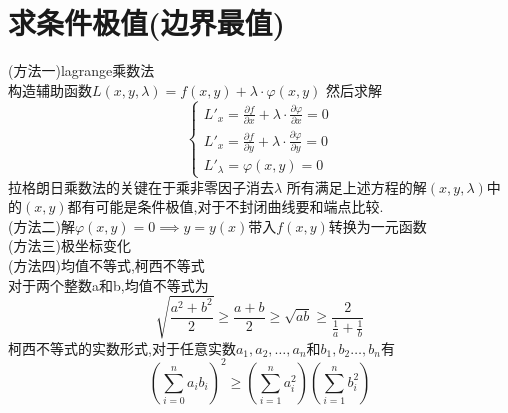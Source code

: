 \documentclass[12pt, a4paper, oneside, UTF8]{ctexbook}
\begin{document}
\section{求条件极值(边界最值)}
\begin{remark}
    (方法一)lagrange乘数法 \\
    构造辅助函数$L(x,y,\lambda)=f(x,y)+\lambda\cdot\varphi(x,y)$ 然后求解 
    $$
    \begin{cases}
        L'_{x}= \frac{\partial f}{\partial x} + \lambda\cdot\frac{\partial\varphi}{\partial x} = 0 \\
        L'_{x}= \frac{\partial f}{\partial y} + \lambda\cdot\frac{\partial\varphi}{\partial y} = 0 \\
        L'_{\lambda} = \varphi(x,y) = 0
    \end{cases}
    $$
    拉格朗日乘数法的关键在于{\color{red}乘非零因子消去$\lambda$}
    所有满足上述方程的解$(x,y,\lambda)$中的$(x,y)$都有可能是条件极值,{\color{red}对于不封闭曲线要和端点比较}. \\
    (方法二)解$\varphi(x,y)=0\implies y = y(x)$带入$f(x,y)$转换为一元函数 \\
    (方法三)极坐标变化 \\
    (方法四)均值不等式,柯西不等式 \\
    对于两个整数a和b,均值不等式为 
    $$
    \sqrt{\frac{a^2+b^2}{2}}\geq\frac{a+b}{2}\geq\sqrt{ab}\geq\frac{2}{\frac{1}{a}+\frac{1}{b}}
    $$
    柯西不等式的实数形式,对于任意实数$a_1,a_2,\ldots,a_n$和$b_1,b_2\ldots,b_n$有
    $$
    \left(\sum_{i=0}^{n}a_ib_i\right)^2\geq\left(\sum_{i=1}^{n}a_i^2\right)\left(\sum_{i=1}^{n}b_i^2\right)
    $$
\end{remark}
\end{document}
